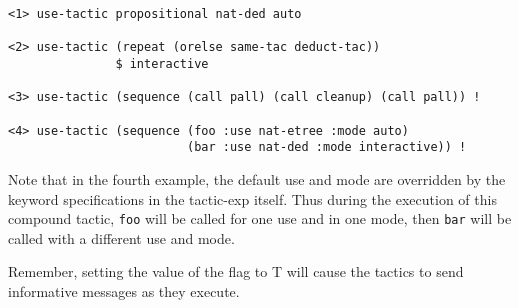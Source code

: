 \begin{verbatim}
<1> use-tactic propositional nat-ded auto

<2> use-tactic (repeat (orelse same-tac deduct-tac)) 
               $ interactive

<3> use-tactic (sequence (call pall) (call cleanup) (call pall)) !

<4> use-tactic (sequence (foo :use nat-etree :mode auto) 
                         (bar :use nat-ded :mode interactive)) !
\end{verbatim}
Note that in the fourth example, the default use and mode are overridden
by the keyword specifications in the tactic-exp itself.  Thus during the
execution of this compound tactic, {\tt foo} will be called for one use and
in one mode, then {\tt bar} will be called with a different use and mode.

Remember, setting the value of the flag  to T will
cause the tactics to send informative messages as they execute.


